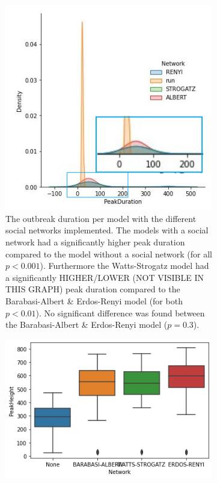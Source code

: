 \documentclass[10pt]{article}
\begin{document}
    \begin{figure}[h!]
        \centering
        \begin{subfigure}[b]{.45\linewidth}
            \includegraphics[width=\textwidth]{pictures/Results/duration_comparison.png}
            \caption{The outbreak duration per model with the different social networks implemented. The models with a social network had a significantly higher peak duration compared to the model without a social network (for all $p < 0.001$). Furthermore the Watts-Strogatz model had a significantly HIGHER/LOWER (NOT VISIBLE IN THIS GRAPH) peak duration compared to the Barabasi-Albert \& Erdos-Renyi model (for both $p < 0.01$). No significant difference was found between the Barabasi-Albert \& Erdos-Renyi model ($p = 0.3$). }
            \label{fig:duration}
        \end{subfigure}
        \begin{subfigure}[b]{.45\linewidth}
            \includegraphics[width=\textwidth]{pictures/Results/BP_peak_height.png}

\end{subfigure}
\end{figure}
\end{document}
